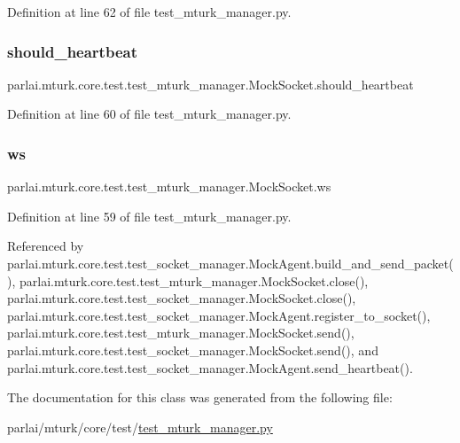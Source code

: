 Definition at line 62 of file test\+\_\+mturk\+\_\+manager.\+py.

\mbox{\label{classparlai_1_1mturk_1_1core_1_1test_1_1test__mturk__manager_1_1MockSocket_a5f423e4be80eb25e28b93dbabc3eb1fe}} 
\subsubsection{\texorpdfstring{should\+\_\+heartbeat}{should\_heartbeat}}
{\footnotesize\ttfamily parlai.\+mturk.\+core.\+test.\+test\+\_\+mturk\+\_\+manager.\+Mock\+Socket.\+should\+\_\+heartbeat}



Definition at line 60 of file test\+\_\+mturk\+\_\+manager.\+py.

\mbox{\label{classparlai_1_1mturk_1_1core_1_1test_1_1test__mturk__manager_1_1MockSocket_a57efd8037541e77e7130b0c1e043eb5c}} 
\subsubsection{\texorpdfstring{ws}{ws}}
{\footnotesize\ttfamily parlai.\+mturk.\+core.\+test.\+test\+\_\+mturk\+\_\+manager.\+Mock\+Socket.\+ws}



Definition at line 59 of file test\+\_\+mturk\+\_\+manager.\+py.



Referenced by parlai.\+mturk.\+core.\+test.\+test\+\_\+socket\+\_\+manager.\+Mock\+Agent.\+build\+\_\+and\+\_\+send\+\_\+packet(), parlai.\+mturk.\+core.\+test.\+test\+\_\+mturk\+\_\+manager.\+Mock\+Socket.\+close(), parlai.\+mturk.\+core.\+test.\+test\+\_\+socket\+\_\+manager.\+Mock\+Socket.\+close(), parlai.\+mturk.\+core.\+test.\+test\+\_\+socket\+\_\+manager.\+Mock\+Agent.\+register\+\_\+to\+\_\+socket(), parlai.\+mturk.\+core.\+test.\+test\+\_\+mturk\+\_\+manager.\+Mock\+Socket.\+send(), parlai.\+mturk.\+core.\+test.\+test\+\_\+socket\+\_\+manager.\+Mock\+Socket.\+send(), and parlai.\+mturk.\+core.\+test.\+test\+\_\+socket\+\_\+manager.\+Mock\+Agent.\+send\+\_\+heartbeat().



The documentation for this class was generated from the following file\+:\begin{DoxyCompactItemize}
\item 
parlai/mturk/core/test/\hyperlink{test_2test__mturk__manager_8py}{test\+\_\+mturk\+\_\+manager.\+py}\end{DoxyCompactItemize}
